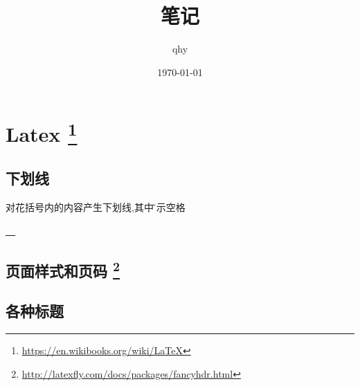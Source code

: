 \documentclass[UTF8,a4paper]{ctexart}
\author{qhy}
\date{\today}
\title{笔记}
\renewcommand{\sectionmark}[1]{\markboth{\thesection.\ #1}{}}
\renewcommand{\headrulewidth}{0.4pt}
\renewcommand{\footrulewidth}{0.4pt}
\begin{document}
    \maketitle
    \tableofcontents
    \newpage

    \section[Latex]{Latex \footnote{\url{https://en.wikibooks.org/wiki/LaTeX}}}
        \subsection{下划线}
        对花括号内的内容产生下划线,其中\~表示空格
        \begin{texcode}
\underline{~~}
        \end{texcode}

        \subsection[页面样式和页码]{页面样式和页码 \footnote{\url{http://latexfly.com/docs/packages/fancyhdr.html}}}
        \begin{texcode}
\usepackage{fancyhdr}

\pagestyle{fancy}
\renewcommand{\sectionmark}[1]{\markboth{\thesection.\ #1}{}}
\lhead{\bfseries \leftmark}

\chead{}
\rhead{}
\rfoot{\thepage}
\setlength{\headheight}{13pt}
\renewcommand{\headrulewidth}{0.4pt}
\renewcommand{\footrulewidth}{0.4pt}

        \end{texcode}


        \subsection{各种标题}
        \begin{texcode}
\chapter
\section
\subsection
\subsubsection
\paragraph
\subparagraph
        \end{texcode}
\end{document}
